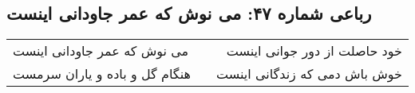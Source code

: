 \begin{center}
\section*{رباعی شماره ۴۷: می نوش که عمر جاودانی اینست}
\label{sec:sh047}
\begin{longtable}{l p{0.5cm} r}
می نوش که عمر جاودانی اینست
&&
خود حاصلت از دور جوانی اینست
\\
هنگام گل و باده و یاران سرمست
&&
خوش باش دمی که زندگانی اینست
\\
\end{longtable}
\end{center}
